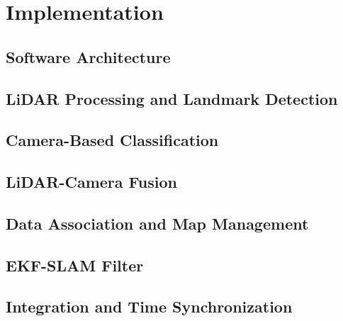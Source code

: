 \chapter{Implementation}
\label{chap:implementation}

\section{Software Architecture}
\label{sec:implementation-software-architecture}

\section{LiDAR Processing and Landmark Detection}
\label{sec:implementation-lidar-processing}

\section{Camera-Based Classification}
\label{sec:implementation-camera-classification}

\section{LiDAR-Camera Fusion}
\label{sec:implementation-sensor-fusion}

\section{Data Association and Map Management}
\label{sec:implementation-data-association}

\section{EKF-SLAM Filter}
\label{sec:implementation-ekf-slam}

\section{Integration and Time Synchronization}
\label{sec:implementation-integration}
